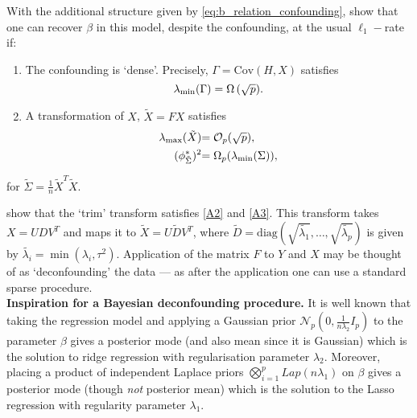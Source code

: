 \documentclass[11pt]{article}
\newcommand{\subparspace}{\vspace{3mm} \\}
\newcommand{\cov}{\textrm{Cov}}
\numberwithin{equation}{section}
\begin{document}
With the additional structure given by \eqref{eq:b_relation_confounding}, \cite{CBM2020} show that one can recover $\beta$ in this model, despite the confounding, at the usual $\ell_1-$rate if:
\begin{enumerate}
	\item The confounding is `dense'. Precisely, $\Gamma = \cov(H, X)$ satisfies 
	\begin{equation}
		{\color{assumption}  \lambda_{\min}(\Gamma) = \Omega\left(\sqrt{p} \right)}. \label{A1}
	\end{equation}
	\item A transformation of $X$, $\tilde{X} = FX$ satisfies
	\begin{align}
			{\color{assumption} \lambda_{\max} (\tilde{X}) }& {\color{assumption} = \mathcal{O}_p(\sqrt{p}), } \label{A2}\\
			{\color{assumption} (\phi^*_{\tilde{\Sigma}})^2} &{\color{assumption} = \Omega_p(\lambda_{\min}(\Sigma))} \label{A3},
		\end{align}
\end{enumerate}
		
		
		for $\tilde{\Sigma} = \frac{1}{n}\tilde{X}^T\tilde{X}$.

\cite{CBM2020} show that the `trim' transform satisfies \eqref{A2} and \eqref{A3}. This transform takes $X = UDV^T$ and maps it to $\tilde{X} = U\tilde{D}V^T$, where $\tilde{D} = \textrm{diag}(\sqrt{\tilde{\lambda_1}}, \dots, \sqrt{\tilde{\lambda_p}})$ is given by $\tilde{\lambda_i} = \min(\lambda_i, \tau^2)$. Application of the matrix $F$ to $Y$ and $X$ may be thought of as `deconfounding' the data --- as after the application one can use a standard sparse procedure.
\subparspace
{\bf Inspiration for a Bayesian deconfounding procedure. }
It is well known that taking the regression model and applying a Gaussian prior $\mathcal{N}_p(0, \frac{1}{n\lambda_2} I_p)$ to the parameter $\beta$ gives a posterior mode (and also mean since it is Gaussian) which is the solution to ridge regression with regularisation parameter $\lambda_2$. Moreover, placing a product of independent Laplace priors $\bigotimes_{i = 1}^p Lap(n\lambda_1)$  on $\beta$ gives a posterior mode (though {\it not} posterior mean) which is the solution to the Lasso regression with regularity parameter $\lambda_1$. 
\end{document}

